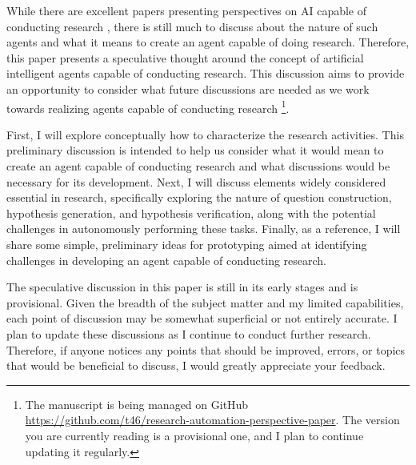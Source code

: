 While there are excellent papers presenting perspectives on AI capable of conducting research \cite{zenil2023future,coley2020autonomous,coley2020autonomousII,kitano2021nobel,wang2023scientific,zenil2023,zhang2023artificial,hope2022computational}, there is still much to discuss about the nature of such agents and what it means to create an agent capable of doing research. Therefore, this paper presents a speculative thought around the concept of artificial intelligent agents capable of conducting research. This discussion aims to provide an opportunity to consider what future discussions are needed as we work towards realizing agents capable of conducting research \footnote{
The manuscript is being managed on GitHub \url{https://github.com/t46/research-automation-perspective-paper}. The version you are currently reading is a provisional one, and I plan to continue updating it regularly.
}.

First, I will explore conceptually how to characterize the research activities. This preliminary discussion is intended to help us consider what it would mean to create an agent capable of conducting research and what discussions would be necessary for its development. Next, I will discuss elements widely considered essential in research, specifically exploring the nature of question construction, hypothesis generation, and hypothesis verification, along with the potential challenges in autonomously performing these tasks. Finally, as a reference, I will share some simple, preliminary ideas for prototyping aimed at identifying challenges in developing an agent capable of conducting research.

The speculative discussion in this paper is still in its early stages and is provisional. Given the breadth of the subject matter and my limited capabilities, each point of discussion may be somewhat superficial or not entirely accurate. I plan to update these discussions as I continue to conduct further research. Therefore, if anyone notices any points that should be improved, errors, or topics that would be beneficial to discuss, I would greatly appreciate your feedback.
